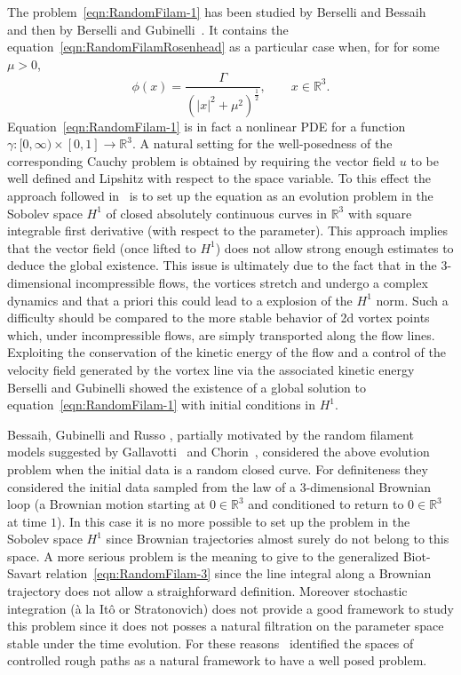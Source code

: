 \documentclass[11pt,a4paper,reqno]{amsart}%
\newcommand\half{\frac12}
\theoremstyle{plain}
\theoremstyle{remark}
\theoremstyle{plain}
\numberwithin{equation}{section}
\begin{document}
The problem~\eqref{eqn:RandomFilam-1} has been studied  by Berselli and Bessaih~\cite{[Bers+Bess_2002]} and then by Berselli and Gubinelli~\cite{[Bers+Gub_2007]}.
It contains the equation~\eqref{eqn:RandomFilamRosenhead}  as a  particular case when, for for some $\mu>0$, 
\[
\phi({x})=\frac{\Gamma}{(\vert {x}\vert^2+\mu^2)^{\half}},\qquad {x}\in\mathbb{R}^3.
\]
Equation~\eqref{eqn:RandomFilam-1} is in fact  a nonlinear PDE for a function $\gamma: [0,\infty)\times[0,1]\to \mathbb{R}^3$. A natural setting for the  well-posedness of the  corresponding Cauchy problem is obtained by requiring  the vector field $u$ to be well defined and Lipshitz with respect to  the space variable.
To this effect the approach followed in~\cite{[Bers+Bess_2002]} is to set up the equation as an evolution problem in the Sobolev space $H^1$ of closed absolutely continuous curves in $\mathbb{R}^3$ with square integrable first derivative (with respect to the parameter). This approach implies that the vector field (once lifted to $H^1$) does not allow   strong enough estimates to  deduce the global existence.
This issue is ultimately due to the fact that in the $3$-dimensional  incompressible flows, the  vortices stretch and undergo a complex dynamics and that a priori this could lead to a explosion of the $H^1$ norm.
Such a difficulty should be compared to the more stable behavior of 2d vortex points which, under incompressible flows, are simply transported along the flow lines.
Exploiting the conservation of the kinetic energy of the flow and a control of the velocity field generated by the vortex line via the associated kinetic energy Berselli and  Gubinelli \cite{[Bers+Gub_2007]}  showed the existence of a global solution to  equation~\eqref{eqn:RandomFilam-1} with initial conditions in $H^1$.

Bessaih, Gubinelli and Russo \cite{[Bess+Gub_2005]}, partially motivated by the random filament models suggested by Gallavotti~\cite{Gallavotti} and  Chorin~\cite{Chorin}, considered the above evolution problem when the initial data  is a random closed curve. For definiteness they  considered the initial data sampled from the law of a $3$-dimensional Brownian loop (a Brownian motion starting at $0\in\mathbb{R}^3$ and conditioned to return to $0\in\mathbb{R}^3$ at time $1$).
In this case it is no more possible to set up the problem in the Sobolev space $H^1$ since Brownian trajectories almost surely do not belong to this space. A more serious problem is the meaning to give to the generalized Biot-Savart relation~\eqref{eqn:RandomFilam-3} since the line integral along a Brownian trajectory does not allow a straighforward definition. Moreover stochastic integration (\`a la It\^o or Stratonovich) does not provide a good framework to study this problem since it does not posses a natural filtration on the parameter space  stable under the time evolution. For these reasons~\cite{[Bess+Gub_2005]} identified the spaces of controlled rough paths as a natural framework to have a well posed problem.
\end{document}
